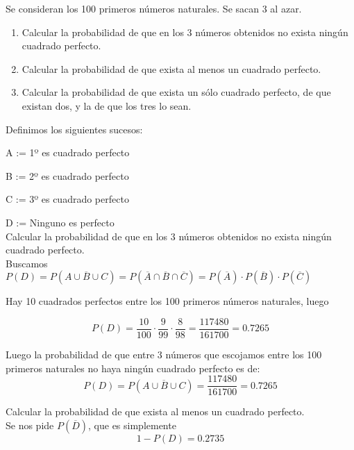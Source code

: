 \problem

Se consideran los 100 primeros n{\'u}meros naturales. Se sacan 3 al azar.
\begin{enumerate}
	\item Calcular la probabilidad de que en los 3 n{\'u}meros obtenidos no exista
	ning{\'u}n cuadrado perfecto.
	\item Calcular la probabilidad de que exista al menos un cuadrado perfecto.
	\item Calcular la probabilidad de que exista un  s{\'o}lo  cuadrado  perfecto,
	de que existan  dos, y la de que los tres lo sean.
\end{enumerate}

Definimos los siguientes sucesos: 

A := 1º es cuadrado perfecto

B := 2º es cuadrado perfecto 

C := 3º es cuadrado perfecto 

D := Ninguno es perfecto \\


\subproblem 
Calcular la probabilidad de que en los 3 números obtenidos no exista ningún cuadrado perfecto. \\


Buscamos $P(D) = P(\overline{A\cup B \cup C}) = P(\overline{A}\cap \overline{B} \cap \overline{C}) =  P(\overline{A})\cdot P(\overline{B}) \cdot P(\overline{C})$

Hay 10 cuadrados perfectos entre los 100 primeros números naturales, luego

$$P(D) = \dfrac{10}{100}\cdot \dfrac{9}{99}\cdot\dfrac{8}{98} = \dfrac{117480}{161700} = 0.7265$$


Luego la probabilidad de que entre 3 números que escojamos entre los 100 primeros naturales no haya ningún cuadrado perfecto es de: $$ P(D) = P(\overline{A\cup B \cup C}) = \dfrac{117480}{161700} = 0.7265$$

\subproblem 
Calcular la probabilidad de que exista al menos un cuadrado perfecto.\\
Se nos pide $P(\overline D)$, que es simplemente 
$$1 - P(D) = 0.2735$$

